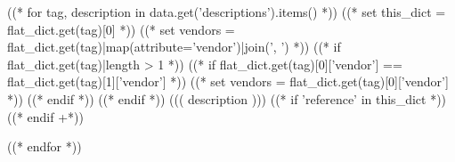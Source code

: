 ((* for tag, description in data.get('descriptions').items() *))
((* set this_dict = flat_dict.get(tag)[0] *))
((* set vendors = flat_dict.get(tag)|map(attribute='vendor')|join(', ') *))
((* if flat_dict.get(tag)|length > 1 *))
((* if flat_dict.get(tag)[0]['vendor'] == flat_dict.get(tag)[1]['vendor'] *))
((* set vendors = flat_dict.get(tag)[0]['vendor'] *))
((* endif *))
((* endif *))
 ((( description ))) ((* if 'reference' in this_dict *))  ((* endif +*))

((* endfor *))